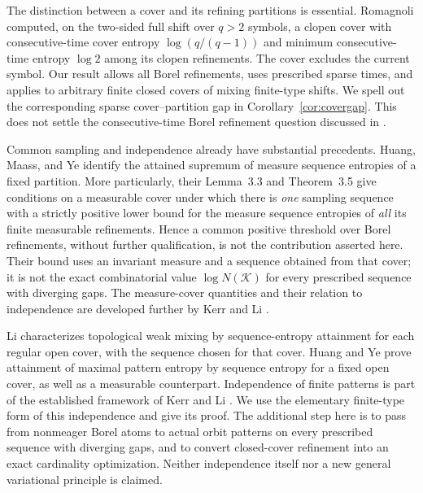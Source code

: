 \documentclass[11pt,reqno]{amsart}
\numberwithin{equation}{section}
\theoremstyle{definition}
\theoremstyle{remark}
\newcommand{\K}{\mathcal K}
\begin{document}
The distinction between a cover and its refining partitions is essential.
Romagnoli \cite{Romagnoli2007} computed, on the two-sided full shift over
$q>2$ symbols, a clopen cover with consecutive-time cover entropy
$\log(q/(q-1))$ and minimum consecutive-time entropy $\log 2$ among its
clopen refinements. The cover excludes the current symbol. Our result
allows all Borel refinements, uses prescribed sparse times, and applies
to arbitrary finite closed covers of mixing finite-type shifts. We spell
out the corresponding sparse cover--partition gap in
Corollary~\ref{cor:covergap}. This does not settle the consecutive-time
Borel refinement question discussed in \cite{Romagnoli2007}.

Common sampling and independence already have substantial precedents.
Huang, Maass, and Ye \cite[Theorem~2.3]{HMY2004} identify the attained
supremum of measure sequence entropies of a fixed partition. More
particularly, their Lemma~3.3 and Theorem~3.5 give conditions on a
measurable cover under which there is \emph{one} sampling sequence with a
strictly positive lower bound for the measure sequence entropies of
\emph{all} its finite measurable refinements. Hence a common positive
threshold over Borel refinements, without further qualification, is not
the contribution asserted here. Their bound uses an invariant measure
and a sequence obtained from that cover; it is not the exact
combinatorial value $\log N(\K)$ for every prescribed sequence with
diverging gaps. The measure-cover quantities and their relation to
independence are developed further by Kerr and Li
\cite[Section~4 of the author version]{KL2009}.

Li \cite[Theorem~2]{Li2002} characterizes topological weak mixing by
sequence-entropy attainment for each regular open cover, with the
sequence chosen for that cover. Huang and Ye
\cite[Theorem~2.1]{HY2009} prove attainment of maximal pattern entropy by
sequence entropy for a fixed open cover, as well as a measurable
counterpart. Independence of finite patterns is part of the established
framework of Kerr and Li \cite{KL2007}. We use the elementary
finite-type form of this independence and give its proof. The additional
step here is to pass from nonmeager Borel atoms to actual orbit patterns
on every prescribed sequence with diverging gaps, and to convert
closed-cover refinement into an exact cardinality optimization. Neither
independence itself nor a new general variational principle is claimed.
\end{document}
